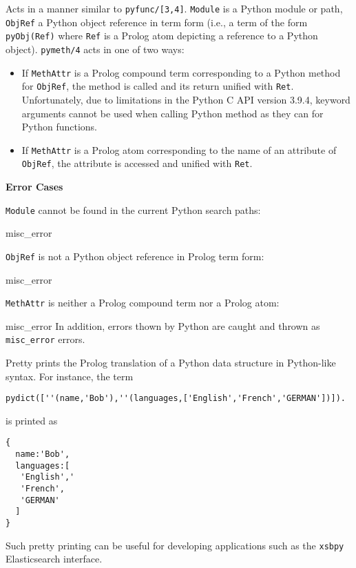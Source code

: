 \begin{description}
%
Acts in a manner similar to {\tt pyfunc/[3,4]}.  {\tt Module} is a
Python module or path, {\tt ObjRef} a Python object reference in term
form (i.e., a term of the form {\tt pyObj(Ref)} where {\tt Ref} is a
Prolog atom depicting a reference to a Python object). {\tt pymeth/4}
acts in one of two ways:
\begin{itemize}
\item If {\tt MethAttr} is a Prolog compound term corresponding to a
  Python method for {\tt ObjRef}, the method is called and its return
  unified with {\tt Ret}.  Unfortunately, due to limitations in the
  Python C API version 3.9.4, keyword arguments cannot be used when
  calling Python method as they can for Python functions.
%
\item If {\tt MethAttr} is a Prolog atom corresponding to the name of
  an attribute of {\tt ObjRef}, the attribute is accessed and unified
  with {\tt Ret}.
\end{itemize}

{\bf Error Cases}
\bi
\item {\tt Module} cannot be found in the current Python search paths:
\bi
\item misc\_error
\ei
\item {\tt ObjRef} is not a Python object reference in Prolog term form:
\bi
\item misc\_error
\ei
\item {\tt MethAttr} is neither a Prolog compound term nor a Prolog atom:
\bi
\item misc\_error
\ei
\ei
In addition, errors thown by Python are caught and thrown as {\tt misc\_error} errors.

%
Pretty prints the Prolog translation of a Python data structure in
Python-like syntax.  For instance, the term

\begin{verbatim}
pydict([''(name,'Bob'),''(languages,['English','French','GERMAN'])]).
\end{verbatim}

\noindent
is printed as 
\begin{verbatim}
{
  name:'Bob',
  languages:[
   'English','
   'French',
   'GERMAN'
  ]
} 
\end{verbatim}

Such pretty printing can be useful for developing applications such as
the {\tt xsbpy} Elasticsearch interface.


\end{description}
